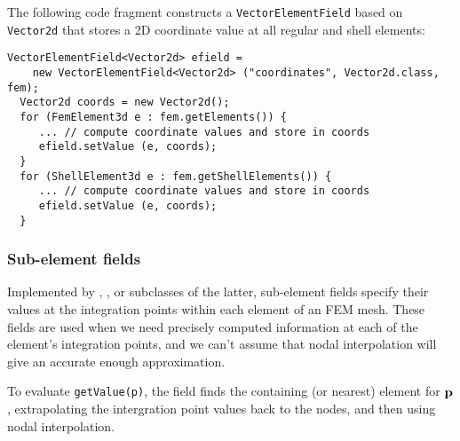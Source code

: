 The following code fragment constructs a {\tt VectorElementField}
based on {\tt Vector2d} that stores a 2D coordinate value at all
regular and shell elements:
%
\begin{lstlisting}[]
  VectorElementField<Vector2d> efield =
    new VectorElementField<Vector2d> ("coordinates", Vector2d.class, fem);
  Vector2d coords = new Vector2d();
  for (FemElement3d e : fem.getElements()) {
     ... // compute coordinate values and store in coords
     efield.setValue (e, coords);
  }
  for (ShellElement3d e : fem.getShellElements()) {
     ... // compute coordinate values and store in coords
     efield.setValue (e, coords);
  }
\end{lstlisting}
%

\subsubsection{Sub-element fields}

Implemented by
,
, 
or subclasses of the latter, sub-element fields specify their values
at the integration points within each element of an FEM mesh. These
fields are used when we need precisely computed information at each of
the element's integration points, and we can't assume that nodal
interpolation will give an accurate enough approximation.

To evaluate {\tt getValue(p)}, the field finds the containing (or
nearest) element for ${\bf p}$, extrapolating the intergration point values
back to the nodes, and then using nodal interpolation.

